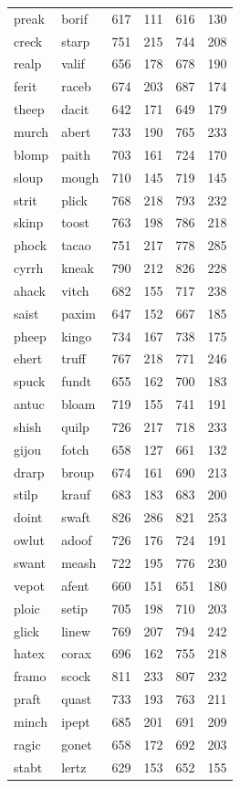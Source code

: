 \documentclass[
]{interact}
\begin{document}
\begin{longtable*}{llrrrr}
preak & borif & 617 & 111 & 616 & 130 \\ 
creck & starp & 751 & 215 & 744 & 208 \\ 
realp & valif & 656 & 178 & 678 & 190 \\ 
ferit & raceb & 674 & 203 & 687 & 174 \\ 
theep & dacit & 642 & 171 & 649 & 179 \\ 
murch & abert & 733 & 190 & 765 & 233 \\ 
blomp & paith & 703 & 161 & 724 & 170 \\ 
sloup & mough & 710 & 145 & 719 & 145 \\ 
strit & plick & 768 & 218 & 793 & 232 \\ 
skinp & toost & 763 & 198 & 786 & 218 \\ 
phock & tacao & 751 & 217 & 778 & 285 \\ 
cyrrh & kneak & 790 & 212 & 826 & 228 \\ 
ahack & vitch & 682 & 155 & 717 & 238 \\ 
saist & paxim & 647 & 152 & 667 & 185 \\ 
pheep & kingo & 734 & 167 & 738 & 175 \\ 
ehert & truff & 767 & 218 & 771 & 246 \\ 
spuck & fundt & 655 & 162 & 700 & 183 \\ 
antuc & bloam & 719 & 155 & 741 & 191 \\ 
shish & quilp & 726 & 217 & 718 & 233 \\ 
gijou & fotch & 658 & 127 & 661 & 132 \\ 
drarp & broup & 674 & 161 & 690 & 213 \\ 
stilp & krauf & 683 & 183 & 683 & 200 \\ 
doint & swaft & 826 & 286 & 821 & 253 \\ 
owlut & adoof & 726 & 176 & 724 & 191 \\ 
swant & meash & 722 & 195 & 776 & 230 \\ 
vepot & afent & 660 & 151 & 651 & 180 \\ 
ploic & setip & 705 & 198 & 710 & 203 \\ 
glick & linew & 769 & 207 & 794 & 242 \\ 
hatex & corax & 696 & 162 & 755 & 218 \\ 
framo & scock & 811 & 233 & 807 & 232 \\ 
praft & quast & 733 & 193 & 763 & 211 \\ 
minch & ipept & 685 & 201 & 691 & 209 \\ 
ragic & gonet & 658 & 172 & 692 & 203 \\ 
stabt & lertz & 629 & 153 & 652 & 155 \\ 
\bottomrule
\end{longtable*}
\end{document}
